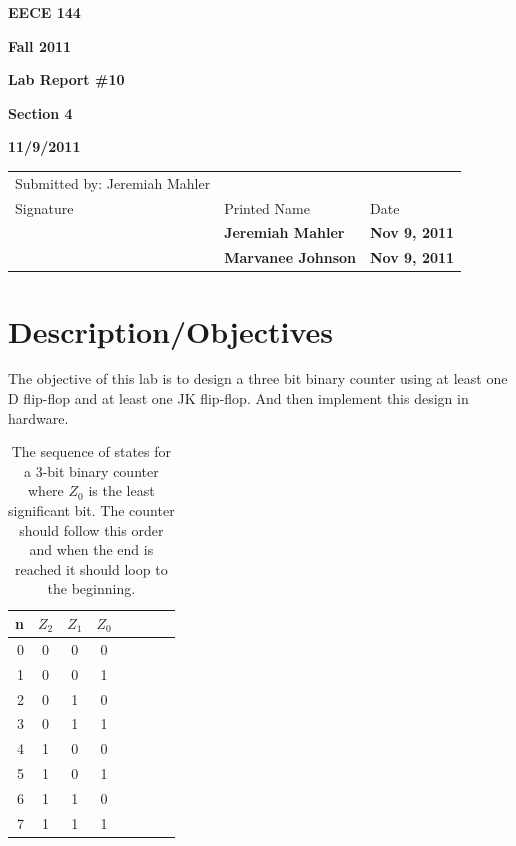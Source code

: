 \documentclass[12pt]{article}
\begin{document}
\centerline{\bf EECE 144}
\centerline{\bf Fall 2011}
\centerline{\bf}
\centerline{\bf Lab Report \#10}
\centerline{\bf Section 4}
\centerline{\bf 11/9/2011}
\begin{center}
\begin{tabularx}{\textwidth}[b]{X l l}
Submitted by: Jeremiah Mahler & & \\
Signature & Printed Name & Date \\
\hline
\multicolumn{1}{|X|}{} & \multicolumn{1}{|l|}{\bigstrut \bf Jeremiah Mahler} & \multicolumn{1}{|l|}{\bf Nov 9, 2011} \\
\hline
\multicolumn{1}{|X|}{} & \multicolumn{1}{|l|}{\bigstrut \bf Marvanee Johnson} & \multicolumn{1}{|l|}{\bf Nov 9, 2011} \\
\hline
\end{tabularx}
\end{center}

\section{Description/Objectives}

The objective of this lab is to design a three bit binary counter
using at least one D flip-flop and at least one JK flip-flop.
And then implement this design in hardware.

\begin{table}[hbp]
\begin{center}
\begin{tabular}[t]{r|cccc|ccc}
n & $Z_2$ & $Z_1$ & $Z_0$ \\
\hline
0 & 0 & 0 & 0 \\
1 & 0 & 0 & 1 \\
2 & 0 & 1 & 0 \\
3 & 0 & 1 & 1 \\
4 & 1 & 0 & 0 \\
5 & 1 & 0 & 1 \\
6 & 1 & 1 & 0 \\
7 & 1 & 1 & 1 \\
\end{tabular}
\end{center}
\caption{The sequence of states for a 3-bit binary counter
where $Z_0$ is the least significant bit.
The counter should follow this order and when the end is reached
it should loop to the beginning.}
\label{tbl:tt}
\end{table}

\end{document}
